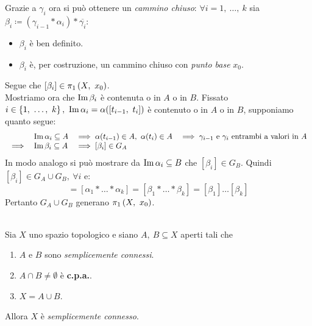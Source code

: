 \begin{demonstration}
\begin{center}
	\end{center}
		\vspace{-6mm}
	Grazie a $\gamma_i$ ora si può ottenere un \textit{cammino chiuso}: $\forall i=1,\ \dots,\ k$ sia $\beta_i\coloneqq (\gamma_{i-1}\ast \alpha_i)\ast\overline{\gamma_i}$:
	\begin{itemize}
		\item $\beta_i$ è ben definito.
		\item $\beta_i$ è, per costruzione, un cammino chiuso con \textit{punto base} $x_0$.
	\end{itemize}
	Segue che $[\beta_i]\in \gruf{X}{x_0}$.\\
	Mostriamo ora che $\operatorname{Im} \beta_i$ è contenuta o in $A$ o in $B$. Fissato $i\in\left\{1,\ \dots,\ k\right\}, \ \im\alpha_i=\alpha([t_{i-1},\ t_i])$ è contenuto o in $A$ o in $B$, supponiamo quanto segue:
		\begin{equation*}
			\begin{array}{llll}
				&\operatorname{Im}\alpha_i \subseteq A &\implies \alpha(t_{i-1})\in A,\ \alpha(t_i)\in A &\implies \gamma_{i-1} \text{ e } \gamma_i \text{ entrambi a valori in }A \\
				\implies& \operatorname{Im}\beta_i \subseteq A &\implies [\beta_i]\in G_A&\\
			\end{array}
		\end{equation*}
	In modo analogo si può mostrare da $\operatorname{Im}\alpha_i \subseteq B$ che $[\beta_i]\in G_B$. Quindi $[\beta_i]\in G_A\cup G_B,\ \forall i$ e:
	\begin{equation*}
		[\alpha]=[\alpha_1 \ast \dots \ast\alpha_k]=[\beta_1\ast\dots\ast\beta_k]=[\beta_1]\dots [\beta_k]
	\end{equation*}
Pertanto $G_A\cup G_B$ generano $\gruf{X}{x_0}$.
\end{demonstration}
\begin{corollary}~{}\label{corollario Van Kampen}\\
Sia $X$ uno spazio topologico e siano $A,\ B\subseteq X$ aperti tali che
		\begin{enumerate}
			\item $A$ e $B$ sono \textit{semplicemente connessi}.
			\item $A\cap B\neq\emptyset$ è \textbf{c.p.a.}.
			\item $X=A\cup B$.
		\end{enumerate}
	Allora $X$ è \textit{semplicemente connesso}.
\end{corollary}
